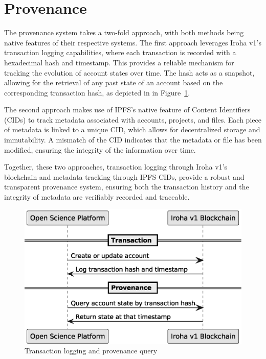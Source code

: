 \documentclass[final]{rc-book-2.14}
\begin{document}
\section{Provenance}
\label{chp:proposed_model:sec:provenance}

The provenance system takes a two-fold approach, with both methods being native features of their respective systems. The first approach leverages Iroha v1’s transaction logging capabilities, where each transaction is recorded with a hexadecimal hash and timestamp. This provides a reliable mechanism for tracking the evolution of account states over time. The hash acts as a snapshot, allowing for the retrieval of any past state of an account based on the corresponding transaction hash, as depicted in in Figure~\ref{fig:provenance}.

The second approach makes use of IPFS’s native feature of Content Identifiers (CIDs) to track metadata associated with accounts, projects, and files. Each piece of metadata is linked to a unique CID, which allows for decentralized storage and immutability. A mismatch of the CID indicates that the metadata or file has been modified, ensuring the integrity of the information over time.

Together, these two approaches, transaction logging through Iroha v1’s blockchain and metadata tracking through IPFS CIDs, provide a robust and transparent provenance system, ensuring both the transaction history and the integrity of metadata are verifiably recorded and traceable.


\begin{figure}[htbp]
    \centering
    \includegraphics[scale=0.5]{fig/provenance_timeline.eps}
    \caption{Transaction logging and provenance query}
    \label{fig:provenance}
\end{figure}
\end{document}
